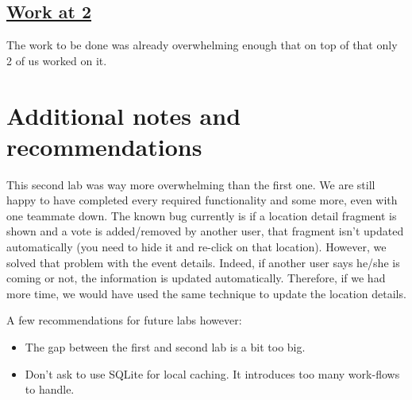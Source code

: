 \documentclass{article}
\begin{document}
\subsection{\href{http://1.bp.blogspot.com/-lvbNllD8faM/U53uHuJGYgI/AAAAAAAAAiY/ZJB1OQj0L-M/s1600/homer.gif}{Work at 2}}

The work to be done was already overwhelming enough that on top of that only 2 of us worked on it.

\section{Additional notes and recommendations}

This second lab was way more overwhelming than the first one. We are still happy to have completed every required functionality and some more, even with one teammate down. The known bug currently is if a location detail fragment is shown and a vote is added/removed by another user, that fragment isn't updated automatically (you need to hide it and re-click on that location). However, we solved that problem with the event details. Indeed, if another user says he/she is coming or not, the information is updated automatically. Therefore, if we had more time, we would have used the same technique to update the location details. 

A few recommendations for future labs however:

\begin{itemize}
\item The gap between the first and second lab is a bit too big. 
\item Don't ask to use SQLite for local caching. It introduces too many work-flows to handle.
\end{itemize}
\end{document}
